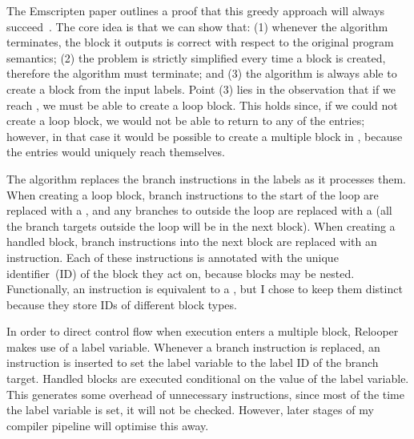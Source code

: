 \documentclass[00-main.tex]{subfiles}
\begin{document}

The Emscripten paper outlines a proof that this greedy approach will always succeed~.
The core idea is that we can show that: (1) whenever the algorithm terminates, the block it outputs is correct with respect to the original program semantics; (2) the problem is strictly simplified every time a block is created, therefore the algorithm must terminate; and (3) the algorithm is always able to create a block from the input labels.
Point (3) lies in the observation that if we reach , we must be able to create a loop block.
This holds since, if we could not create a loop block, we would not be able to return to any of the entries; however, in that case it would be possible to create a multiple block in , because the entries would uniquely reach themselves.

The algorithm replaces the branch instructions in the labels as it processes them.
When creating a loop block, branch instructions to the start of the loop are replaced with a , and any branches to outside the loop are replaced with a  (all the branch targets outside the loop will be in the next block).
When creating a handled block, branch instructions into the next block are replaced with an  instruction.
Each of these instructions is annotated with the unique identifier~(ID) of the block they act on, because blocks may be nested.
Functionally, an  instruction is equivalent to a , but I chose to keep them distinct because they store IDs of different block types.

In order to direct control flow when execution enters a multiple block, Relooper makes use of a label variable.
Whenever a branch instruction is replaced, an instruction is inserted to set the label variable to the label ID of the branch target.
Handled blocks are executed conditional on the value of the label variable.
This generates some overhead of unnecessary instructions, since most of the time the label variable is set, it will not be checked.
However, later stages of my compiler pipeline will optimise this away.
\end{document}
